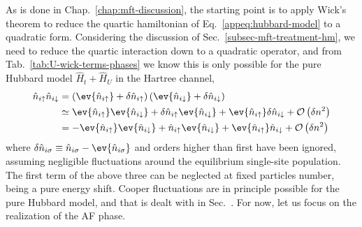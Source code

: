 As is done in Chap.~\ref{chap:mft-discussion}, the starting point is to apply Wick's theorem to reduce the quartic hamiltonian of Eq.~\eqref{appeq:hubbard-model} to a quadratic form. Considering the discussion of Sec.~\ref{subsec-mft-treatment-hm}, we need to reduce the quartic interaction down to a quadratic operator, and from Tab.~\ref{tab:U-wick-terms-phases} we know this is only possible for the pure Hubbard model $\hat H_t + \hat H_U$ in the Hartree channel,
\[
\begin{aligned}
	\hat n_{i\uparrow} \hat n_{i\downarrow} &= \left( \ev{\hat n_{i\uparrow}} + \delta \hat n_{i\uparrow} \right) \left( \ev{\hat n_{i\downarrow}} + \delta \hat n_{i\downarrow} \right) \\
	&\simeq \ev{\hat n_{i\uparrow}} \ev{\hat n_{i\downarrow}} +  \delta \hat n_{i\uparrow} \ev{\hat n_{i\downarrow}} + \ev{\hat n_{i\uparrow}} \delta \hat n_{i\downarrow} + \mathcal{O} \left(\delta n^2\right) \\
	&= - \ev{\hat n_{i\uparrow}} \ev{\hat n_{i\downarrow}} + \hat n_{i\uparrow} \ev{\hat n_{i\downarrow}} + \ev{\hat n_{i\uparrow}} \hat n_{i\downarrow} + \mathcal{O} \left(\delta n^2\right)
\end{aligned}
\]
where $\delta \hat n_{i\sigma} \equiv \hat n_{i\sigma} - \ev{\hat n_{i\sigma}}$ and orders higher than first have been ignored, assuming negligible fluctuations around the equilibrium single-site population. The first term of the above three can be neglected at fixed particles number, being a pure energy shift. Cooper fluctuations are in principle possible for the pure Hubbard model, and that is dealt with in Sec.~\mref. For now, let us focus on the realization of the AF phase.

